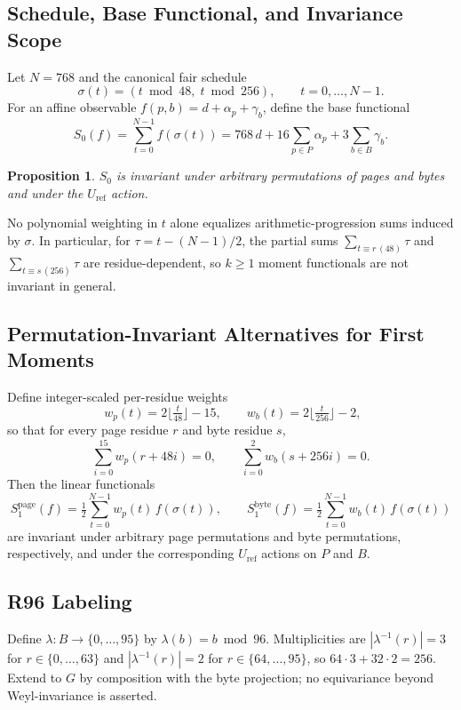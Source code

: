 \documentclass[12pt]{article}
\newtheorem{proposition}[theorem]{Proposition}
\begin{document}
\subsection{Schedule, Base Functional, and Invariance Scope}
Let $N=768$ and the canonical fair schedule
\[
\sigma(t)=(t\bmod 48,\; t\bmod 256),\qquad t=0,\dots,N-1.
\]
For an affine observable $f(p,b)=d+\alpha_p+\gamma_b$, define the base functional
\[
S_0(f)=\sum_{t=0}^{N-1} f(\sigma(t))=768\,d+16\sum_{p\in P}\!\alpha_p+3\sum_{b\in B}\!\gamma_b.
\]
\begin{proposition}
$S_0$ is invariant under arbitrary permutations of pages and bytes and under the $U_{\mathrm{ref}}$ action.
\end{proposition}
\begin{remark}
No polynomial weighting in $t$ alone equalizes arithmetic-progression sums induced by $\sigma$. In particular, for $\tau=t-(N-1)/2$, the partial sums $\sum_{t\equiv r\,(48)}\!\tau$ and $\sum_{t\equiv s\,(256)}\!\tau$ are residue-dependent, so $k\ge 1$ moment functionals are not invariant in general.
\end{remark}

\subsection{Permutation-Invariant Alternatives for First Moments}
Define integer-scaled per-residue weights
\[
\,\, w_p(t)=2\Big\lfloor\tfrac{t}{48}\Big\rfloor-15,\qquad w_b(t)=2\Big\lfloor\tfrac{t}{256}\Big\rfloor-2,
\]
so that for every page residue $r$ and byte residue $s$,
\[
\sum_{i=0}^{15} w_p(r+48i)=0,\qquad \sum_{i=0}^{2} w_b(s+256i)=0.
\]
Then the linear functionals
\[
S^{\mathrm{page}}_1(f)=\tfrac{1}{2}\sum_{t=0}^{N-1} w_p(t)\, f(\sigma(t)),\qquad
S^{\mathrm{byte}}_1(f)=\tfrac{1}{2}\sum_{t=0}^{N-1} w_b(t)\, f(\sigma(t))
\]
are invariant under arbitrary page permutations and byte permutations, respectively, and under the corresponding $U_{\mathrm{ref}}$ actions on $P$ and $B$.

\subsection{R96 Labeling}
Define $\lambda:B\to\{0,\dots,95\}$ by $\lambda(b)=b\bmod 96$. Multiplicities are $|\lambda^{-1}(r)|=3$ for $r\in\{0,\dots,63\}$ and $|\lambda^{-1}(r)|=2$ for $r\in\{64,\dots,95\}$, so $64\cdot 3+32\cdot 2=256$. Extend to $G$ by composition with the byte projection; no equivariance beyond Weyl-invariance is asserted.
\end{document}
